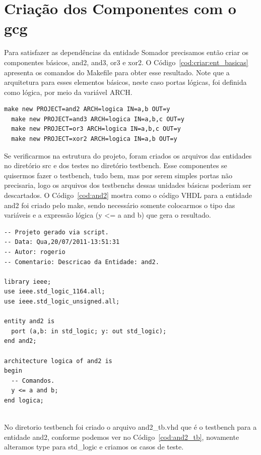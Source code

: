 \documentclass[a4paper,11pt]{report}
\begin{document}
\section{Criação dos Componentes com o gcg}

Para satisfazer as dependências da entidade Somador precisamos então criar os componentes básicos, and2, and3, or3 e xor2. O Código~\ref{cod:criar:ent_basicas} apresenta os comandos do Makefile para obter esse resultado. Note que a arquitetura para esses elementos básicos, neste caso portas lógicas, foi definida como lógica, por meio da variável ARCH.

\lstset{numbers=left, numberstyle=\tiny, stepnumber=1, numbersep=3pt}
\begin{lstlisting}[label=cod:criar:ent_basicas,caption=Comandos para a criação das entidades básicas]
  make new PROJECT=and2 ARCH=logica IN=a,b OUT=y
  make new PROJECT=and3 ARCH=logica IN=a,b,c OUT=y
  make new PROJECT=or3 ARCH=logica IN=a,b,c OUT=y
  make new PROJECT=xor2 ARCH=logica IN=a,b OUT=y
\end{lstlisting}

Se verificarmos na estrutura do projeto, foram criados os arquivos das entidades no diretório src e dos testes no diretório testbench. Esse componentes se quisermos fazer o testbench, tudo bem, mas por serem simples portas não precisaria, logo os arquivos dos testbenchs dessas unidades básicas poderiam ser descartados.
O Código~\ref{cod:and2} mostra como o código VHDL para a entidade and2 foi criado pelo make, sendo necessário somente colocarmos o tipo das variáveis e a expressão lógica (y <= a and b) que gera o resultado.

\lstset{language=VHDL}
\lstset{numbers=left, numberstyle=\tiny, stepnumber=1, numbersep=3pt}
\begin{lstlisting}[label=cod:and2,caption=Código VHDL da entidade and2]
-- Projeto gerado via script.
-- Data: Qua,20/07/2011-13:51:31
-- Autor: rogerio
-- Comentario: Descricao da Entidade: and2.
 
library ieee;
use ieee.std_logic_1164.all;
use ieee.std_logic_unsigned.all;
 
entity and2 is
  port (a,b: in std_logic; y: out std_logic);
end and2;
 
architecture logica of and2 is
begin
  -- Comandos.
  y <= a and b;
end logica;
 
\end{lstlisting}

No diretorio testbench foi criado o arquivo and2\_tb.vhd que é o testbench para a entidade and2, conforme podemos ver no Código~\ref{cod:and2_tb}, novamente alteramos type para std\_logic e criamos os casos de teste.
\end{document}
